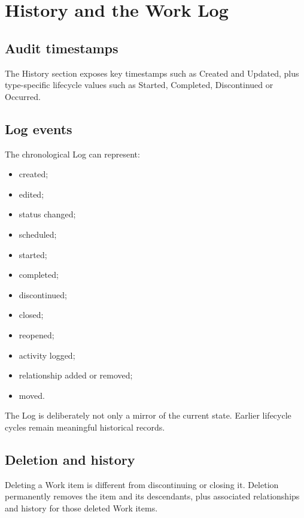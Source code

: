 \documentclass{testudomanual}
\begin{document}
\chapter{History and the Work Log}

\section{Audit timestamps}

The History section exposes key timestamps such as Created and Updated, plus type-specific lifecycle values such as Started, Completed, Discontinued or Occurred.

\section{Log events}

The chronological Log can represent:
\begin{itemize}
    \item created;
    \item edited;
    \item status changed;
    \item scheduled;
    \item started;
    \item completed;
    \item discontinued;
    \item closed;
    \item reopened;
    \item activity logged;
    \item relationship added or removed;
    \item moved.
\end{itemize}

The Log is deliberately not only a mirror of the current state. Earlier lifecycle cycles remain meaningful historical records.

\section{Deletion and history}

Deleting a Work item is different from discontinuing or closing it. Deletion permanently removes the item and its descendants, plus associated relationships and history for those deleted Work items.

\end{document}
